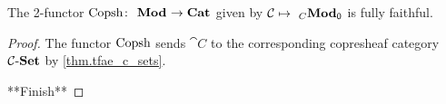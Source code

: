 \documentclass[Book-Poly]{subfiles}
\begin{document}
\begin{theorem}
The 2-functor $\mathrm{Copsh}\colon~_{}\mathbf{Mod}_{}\to\mathbf{Cat}$ given by $\mathcal{C}\mapsto~_{C}\mathbf{Mod}_{\textsf{0}}$ is fully faithful.
\end{theorem}
\begin{proof}
The functor $\mathrm{Copsh}$ sends $\cat{C}$ to the corresponding copresheaf category $\mathcal{C}\textnormal{-}\mathbf{Set}$ by \cref{thm.tfae_c_sets}.

**Finish**
\end{proof}


%
\end{document}
